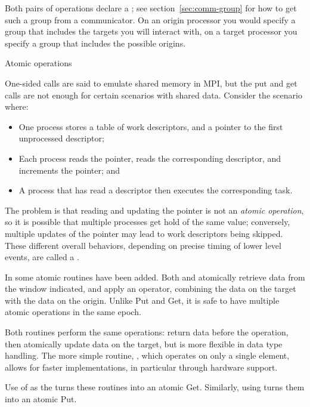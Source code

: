 Both pairs of operations declare a
; see section~\ref{sec:comm-group}
for how to get such a group from a communicator.
On an origin processor you would specify a group that includes the targets
you will interact with, on a target processor you specify a group
that includes the possible origins.

 {Atomic operations}
\label{sec:mpi-atomic}

One-sided calls are said to emulate shared memory in MPI, but 
the put and get calls are not enough for certain scenarios with shared
data. Consider the scenario where:

\begin{itemize}
\item One process stores a table of work descriptors, and a pointer to
  the first unprocessed descriptor;
\item Each process reads the pointer, reads the corresponding
  descriptor, and increments the pointer; and
\item A process that has read a descriptor then executes the
  corresponding task.
\end{itemize}

The problem is that reading and updating the pointer is not an
\emph{atomic operation}, so
it is possible that multiple processes get hold of the same value;
conversely, multiple updates of the pointer may lead to work
descriptors being skipped.
These different overall behaviors, depending on precise timing of lower level events,
are called a .

In  some atomic routines have been added.
Both  and 
atomically retrieve data from the window indicated,
and apply an operator, combining the data on the target
with the data on the origin.
Unlike Put and Get, it is safe to have multiple atomic operations
in the same epoch.

Both routines perform the same operations: return data before the
operation, then atomically update data on the target, but
 is more flexible in data type
handling. The more simple routine, ,
which operates on only a single element,
allows for faster implementations, in particular through hardware support.

Use of  as the 
turns these routines into an atomic Get. Similarly, using
 turns them into an atomic Put.

